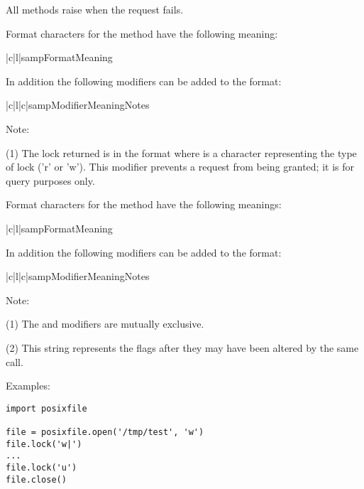 All methods raise  when the request fails.

Format characters for the  method have the following
meaning:

\begin{tableii}{|c|l|}{samp}{Format}{Meaning}
\end{tableii}

In addition the following modifiers can be added to the format:

\begin{tableiii}{|c|l|c|}{samp}{Modifier}{Meaning}{Notes}
\end{tableiii}

Note:

(1) The lock returned is in the format  where  is a character
representing the type of lock ('r' or 'w').  This modifier prevents a
request from being granted; it is for query purposes only.

Format characters for the  method have the following
meanings:

\begin{tableii}{|c|l|}{samp}{Format}{Meaning}
\end{tableii}

In addition the following modifiers can be added to the format:

\begin{tableiii}{|c|l|c|}{samp}{Modifier}{Meaning}{Notes}
\end{tableiii}

Note:

(1) The \code{!} and \code{=} modifiers are mutually exclusive.

(2) This string represents the flags after they may have been altered
by the same call.

Examples:

\begin{verbatim}
import posixfile

file = posixfile.open('/tmp/test', 'w')
file.lock('w|')
...
file.lock('u')
file.close()
\end{verbatim}
